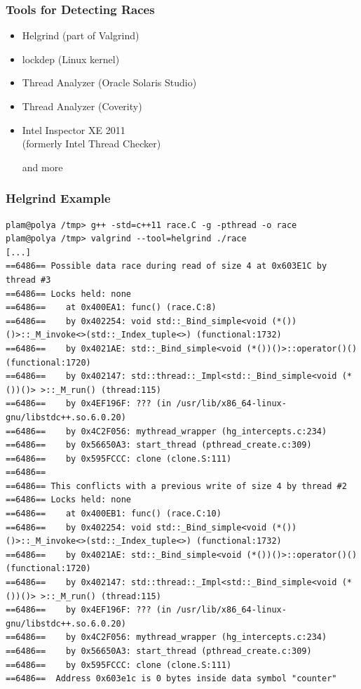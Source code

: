 \documentclass{beamer}
\newenvironment{changemargin}[1]{%
  \begin{list}{}{%
    \setlength{\topsep}{0pt}%
    \setlength{\leftmargin}{#1}%
    \setlength{\rightmargin}{1em}
    \setlength{\listparindent}{\parindent}%
    \setlength{\itemindent}{\parindent}%
    \setlength{\parsep}{\parskip}%
  }%
  \item[]}{\end{list}}
\begin{document}
\begin{frame}
  \frametitle{Tools for Detecting Races}
  \begin{changemargin}{2cm}
    \begin{itemize}
    \item Helgrind (part of Valgrind)
    \item lockdep (Linux kernel)
    \item Thread Analyzer (Oracle Solaris Studio)
    \item Thread Analyzer (Coverity)
    \item Intel Inspector XE 2011 \\
      \hspace*{2em}(formerly Intel Thread Checker)
    \item [and more]
    \end{itemize}
  \end{changemargin}
\end{frame}

\begin{frame}[fragile]
  \frametitle{Helgrind Example}
    \scriptsize
\begin{verbatim}
plam@polya /tmp> g++ -std=c++11 race.C -g -pthread -o race
plam@polya /tmp> valgrind --tool=helgrind ./race
[...]
==6486== Possible data race during read of size 4 at 0x603E1C by thread #3
==6486== Locks held: none
==6486==    at 0x400EA1: func() (race.C:8)
==6486==    by 0x402254: void std::_Bind_simple<void (*())()>::_M_invoke<>(std::_Index_tuple<>) (functional:1732)
==6486==    by 0x4021AE: std::_Bind_simple<void (*())()>::operator()() (functional:1720)
==6486==    by 0x402147: std::thread::_Impl<std::_Bind_simple<void (*())()> >::_M_run() (thread:115)
==6486==    by 0x4EF196F: ??? (in /usr/lib/x86_64-linux-gnu/libstdc++.so.6.0.20)
==6486==    by 0x4C2F056: mythread_wrapper (hg_intercepts.c:234)
==6486==    by 0x56650A3: start_thread (pthread_create.c:309)
==6486==    by 0x595FCCC: clone (clone.S:111)
==6486== 
==6486== This conflicts with a previous write of size 4 by thread #2
==6486== Locks held: none
==6486==    at 0x400EB1: func() (race.C:10)
==6486==    by 0x402254: void std::_Bind_simple<void (*())()>::_M_invoke<>(std::_Index_tuple<>) (functional:1732)
==6486==    by 0x4021AE: std::_Bind_simple<void (*())()>::operator()() (functional:1720)
==6486==    by 0x402147: std::thread::_Impl<std::_Bind_simple<void (*())()> >::_M_run() (thread:115)
==6486==    by 0x4EF196F: ??? (in /usr/lib/x86_64-linux-gnu/libstdc++.so.6.0.20)
==6486==    by 0x4C2F056: mythread_wrapper (hg_intercepts.c:234)
==6486==    by 0x56650A3: start_thread (pthread_create.c:309)
==6486==    by 0x595FCCC: clone (clone.S:111)
==6486==  Address 0x603e1c is 0 bytes inside data symbol "counter"
\end{verbatim}
\end{frame}
\end{document}
